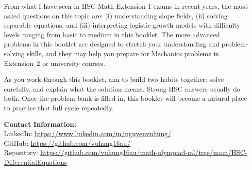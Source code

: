 \documentclass[12pt]{article}
\begin{document}
From what I have seen in HSC Math Extension 1 exams in recent years, the most asked questions on this topic are: (i) understanding slope fields, (ii) solving separable equations, and (iii) interpreting logistic growth models with difficulty levels ranging from basic to medium in this booklet. The more advanced problems in this booklet are designed to stretch your understanding and problem-solving skills, and they may help you prepare for Mechanics problems in Extension~2 or university courses.

As you work through this booklet, aim to build two habits together: solve carefully, and explain what the solution means. Strong HSC answers usually do both. Once the problem bank is filled in, this booklet will become a natural place to practice that full cycle repeatedly.

\vspace{2em}
\noindent\textbf{Contact Information:}\\[0.5em]
LinkedIn: \href{https://www.linkedin.com/in/nguyenvuhung/}{https://www.linkedin.com/in/nguyenvuhung/}\\[0.3em]
GitHub: \href{https://github.com/vuhung16au/}{https://github.com/vuhung16au/}\\[0.3em]
Repository: \href{https://github.com/vuhung16au/math-olympiad-ml/tree/main/HSC-DifferentialEquations}{https://github.com/vuhung16au/math-olympiad-ml/tree/main/HSC-DifferentialEquations}
\end{document}

